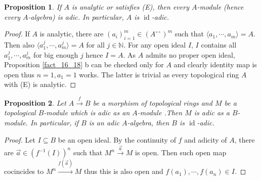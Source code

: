 \documentclass[8pt]{article}
\numberwithin{equation}{section}
\newtheorem{proposition}{Proposition}[subsection]
\DeclareMathOperator{\id}{id}
\newcommand{\N}[0]{\mathbb{N}}
\newcommand{\dcirc}[0]{{\circ\circ}}
\begin{document}
\begin{proposition}
    \label{fact_16_20}
    If $A$ is analytic or satisfies (E), then every $A$-module (hence every $A$-algebra) is adic. In particular, $A$ is $\id$-adic. 
\end{proposition}
\begin{proof}
     If $A$ is analytic, there are $(a_i)_{i=1}^m\in (A^\dcirc)^m$ such that $\langle a_1,\cdots,a_m\rangle=A$. Then also $\langle a_1^j,\cdots,a_m^j\rangle =A$ for all $j\in\N$. For any open ideal $I$, $I$ contains all $a_1^j,\cdots,a_m^j$ for big enough $j$ hence $I = A$. As $A$ admits no proper open ideal, Proposition \ref{fact_16_18} b can be checked only for $A$ and clearly identity map is open thus $n=1,a_1=1$ works. The latter is trivial as every topological ring $A$ with (E) is analytic.%
\end{proof}

\begin{proposition}
    \label{fact_16_21}
    Let $A\stackrel{f}{\to} B$ be a morphism of topological rings and $M$ be a topological $B$-module which is adic as an $A$-module .Then $M$ is adic as a $B$-module. In particular, if $B$ is an adic $A$-algebra, then $B$ is $\id$-adic.
\end{proposition}
\begin{proof}
Let $I\subseteq B$ be an open ideal. By the continuity of $f$ and adicity of $A$, there are $\vec{a}\in(f^{-1}(I))^n$ such that $M^n\stackrel{\vec{a}}{\to} M$ is open. %
Then such open map cocincides to $M^n\stackrel{f(\vec{a})}{\to} M$ thus this is also open and $f(a_1),\cdots,f(a_n)\in I$. %
\end{proof}


\end{document}
